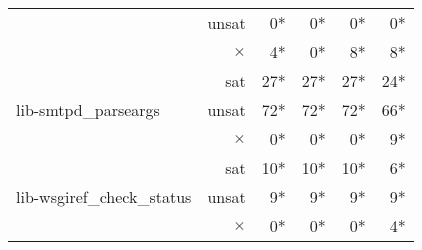 \begin{table*}[t]
\begin{tabular}{l r | r r r r}
							& unsat    &  0*  & 0* & 0* &  0* \\
							& $\times$ &  4*  &  0* &  8* & 8* \\ \hline
\multirow{3}{*}{lib-smtpd\_parseargs}	& sat & 27*  &  27* &  27* &  24* \\ 
							& unsat    &  72*  & 72* & 72* &  66* \\
							& $\times$ &  0*  &  0* &  0* & 9* \\ \hline
\multirow{3}{*}{lib-wsgiref\_check\_status}	& sat & 10*  &  10* &  10* &  6* \\ 
							& unsat    &  9*  & 9* & 9* &  9* \\
							& $\times$ &  0*  &  0* &  0* & 4* \\ \hline
\end{tabular}
\label{table:str_int_benchmark}
\end{table*}


